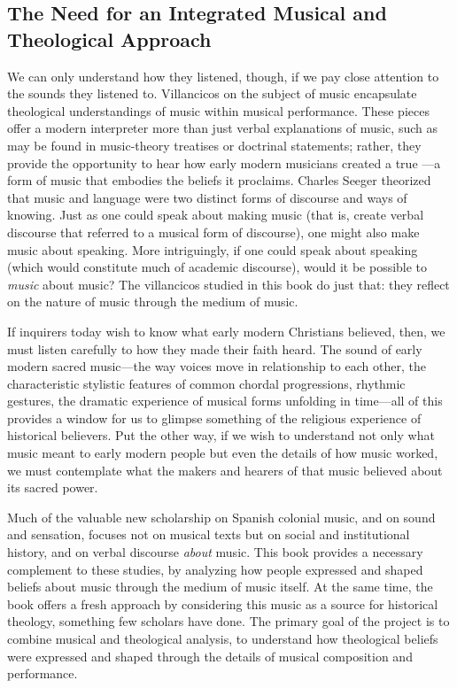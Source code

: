 \subsection{The Need for an Integrated Musical and Theological Approach}


We can only understand how they listened, though, if we pay close attention to
the sounds they listened to.
Villancicos on the subject of music encapsulate theological understandings of
music within musical performance.
These pieces offer a modern interpreter more than just verbal explanations of
music, such as may be found in music-theory treatises or doctrinal statements;
rather, they provide the opportunity to hear how early modern musicians created
a true ---a form of music that embodies the beliefs it
proclaims.
Charles Seeger theorized that music and language were two distinct forms of
discourse and ways of knowing.%
    \Autocite{Seeger:Unitary} 
Just as one could speak about making music (that is, create verbal discourse
that referred to a musical form of discourse), one might also make music about
speaking.
More intriguingly, if one could speak about speaking (which would constitute
much of academic discourse), would it be possible to \emph{music} about music? 
The villancicos studied in this book do just that: they reflect on the nature
of music through the medium of music.

If inquirers today wish to know what early modern Christians believed, then, we
must listen carefully to how they made their faith heard.
The sound of early modern sacred music---the way voices move in relationship to
each other, the characteristic stylistic features of common chordal
progressions, rhythmic gestures, the dramatic experience of musical forms
unfolding in time---all of this provides a window for us to glimpse something
of the religious experience of historical believers.
Put the other way, if we wish to understand not only what music meant to early
modern people but even the details of how music worked, we must contemplate
what the makers and hearers of that music believed about its sacred power. 

Much of the valuable new scholarship on Spanish colonial music, and on sound
and sensation, focuses not on musical texts but on social and institutional
history, and on verbal discourse \emph{about} music.%
    \Autocites{Baker:Harmony}{BakerKnighton:MusicUrbanSociety}
    {Irving:Colonial}{RamosKittrell:PlayingCathedral}
    {DellAntonio:Listening}
This book provides a necessary complement to these studies, by analyzing how
people expressed and shaped beliefs about music through the medium of music
itself.
At the same time, the book offers a fresh approach by considering this music as
a source for historical theology, something few scholars have done.
The primary goal of the project is to combine musical and theological analysis,
to understand how theological beliefs were expressed and shaped through the
details of musical composition and performance.

